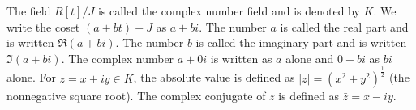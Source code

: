 The field $R[t]/J$ is called the complex number field and is denoted by $K$. We write the coset $(a + bt) + J$ as $a + bi$. The number $a$ is called the real part and is written $\Re(a + bi)$. The number $b$ is called the imaginary part and is written $\Im(a + bi)$. The complex number $a + 0i$ is written as $a$ alone and $0 + bi$ as $bi$ alone. For $z = x + iy \in K$, the absolute value is defined as $|z| = (x^2 + y^2)^{\frac{1}{2}}$ (the nonnegative square root). The complex conjugate of $z$ is defined as $\bar{z} = x - iy$.